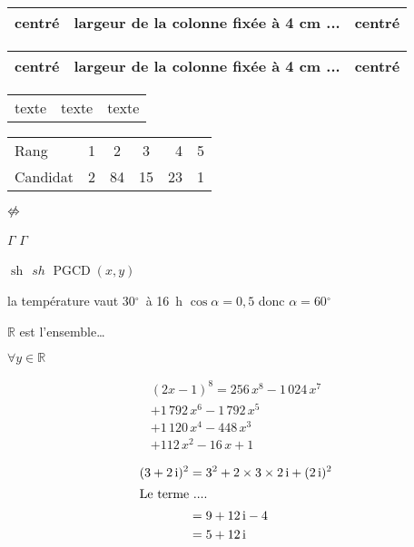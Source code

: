 \documentclass[12pt,a4paper,oneside,twocolumn]{article} %
\numberwithin{equation}{section}
\DeclareMathOperator{\sh}{sh}
\DeclareMathOperator{\PGCD}{PGCD}
\begin{document}
\begin{tabular}{|c|m{4cm}|c|}
\hline
centré & largeur de la colonne fixée à 4 cm ... & centré \\
\hline
\end{tabular}

\begin{tabular}{|c|p{4cm}|c|}
\hline
centré & largeur de la colonne fixée à 4 cm ... & centré \\
\hline
\end{tabular}

\begin{tabular}{|r|r|r|}
\hline
texte & texte & texte \\
\cline{2-3}
\end{tabular}

\begin{tabular}{l*{3}{c}|*{2}{r|}}%
Rang & 1 & 2 & 3 & 4 & 5 \\
Candidat & 2 & 84 & 15 & 23 & 1 \\
\end{tabular}

$\centernot \Leftrightarrow$

$\mathit{\Gamma}$   $\Gamma$ 

$ \sh ~~ sh$
$\PGCD(x,y)$ 

\newcommand{\Degre}{\ensuremath{^\circ}}
la température vaut 30\Degre\ à 16~h
$\cos\alpha=0,5$ donc $\alpha=60\Degre$

\newcommand{\ER}{\ensuremath{\mathbb{R}}}
\ER{} est l’ensemble\dots\par
$\forall y \in \ER$

\begin{multline} %
(2x-1)^8=256\,x^8-1\,024\,x^7\\
+1\,792\,x^6-1\,792\,x^5\\
+1\,120\,x^4-448\,x^3\\+112\,x^2-16\,x+1
\end{multline}

\begin{align*}
(3 + 2\,\mathrm{i})^2
&= 3^2 + 2 \times 3 \times 2\,\mathrm{i}
+ (2\,\mathrm{i})^2 \\
\intertext{Le terme ....}
&= 9 + 12\,\mathrm{i} -4 \\
&= 5 + 12\,\mathrm{i}
\end{align*}
\end{document}
